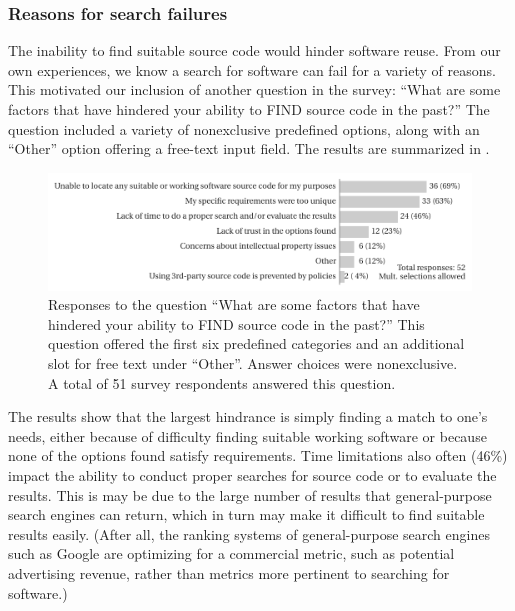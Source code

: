 \documentclass{casicswhitepaper}
\begin{document}
\subsubsection{Reasons for search failures}
\label{reasons-for-search-failure}

The inability to find suitable source code would hinder software reuse.  From our own experiences, we know a search for software can fail for a variety of reasons.  This motivated our inclusion of another question in the survey: ``What are some factors that have hindered your ability to FIND source code in the past?''  The question included a variety of nonexclusive predefined options, along with an ``Other'' option offering a free-text input field.  The results are summarized in .

\begin{figure}[b]
  \vspace*{-2ex}
  \centering
  \includegraphics[width=6.5in]{files/plots/factors-that-hindered-finding-src.pdf}
  \vspace*{-4ex}
  \caption{Responses to the question ``What are some factors that have hindered your ability to FIND source code in the past?''  This question offered the first six predefined categories and an additional slot for free text under ``Other''.  Answer choices were nonexclusive.  A total of 51 survey respondents answered this question.}
  \label{factors-that-hindered}
\end{figure}

The results show that the largest hindrance is simply finding a match to one's needs, either because of difficulty finding suitable working software or because none of the options found satisfy requirements.  Time limitations also often (46\%) impact the ability to conduct proper searches for source code or to evaluate the results.  This is may be due to the large number of results that general-purpose search engines can return, which in turn may make it difficult to find suitable results easily.  (After all, the ranking systems of general-purpose search engines such as Google are optimizing for a commercial metric, such as potential advertising revenue, rather than metrics more pertinent to searching for software.)
\end{document}
